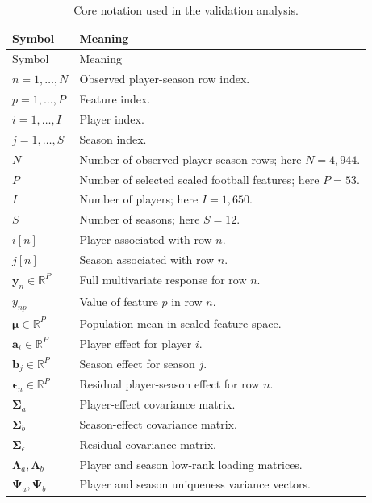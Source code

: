 \documentclass[11pt]{article}
\begin{document}
\begin{longtable}{L{0.20\textwidth}L{0.72\textwidth}}
\caption{Core notation used in the validation analysis.}
\label{tab:notation}\\
\toprule
Symbol & Meaning \\
\midrule
\endfirsthead
\toprule
Symbol & Meaning \\
\midrule
\endhead
\bottomrule
\endfoot
\(n = 1,\ldots,N\) & Observed player-season row index. \\
\(p = 1,\ldots,P\) & Feature index. \\
\(i = 1,\ldots,I\) & Player index. \\
\(j = 1,\ldots,S\) & Season index. \\
\(N\) & Number of observed player-season rows; here \(N=4{,}944\). \\
\(P\) & Number of selected scaled football features; here \(P=53\). \\
\(I\) & Number of players; here \(I=1{,}650\). \\
\(S\) & Number of seasons; here \(S=12\). \\
\(i[n]\) & Player associated with row \(n\). \\
\(j[n]\) & Season associated with row \(n\). \\
\(\mathbf{y}_n\in\mathbb{R}^{P}\) & Full multivariate response for row \(n\). \\
\(y_{np}\) & Value of feature \(p\) in row \(n\). \\
\(\boldsymbol{\mu}\in\mathbb{R}^{P}\) & Population mean in scaled feature space. \\
\(\mathbf{a}_i\in\mathbb{R}^{P}\) & Player effect for player \(i\). \\
\(\mathbf{b}_j\in\mathbb{R}^{P}\) & Season effect for season \(j\). \\
\(\boldsymbol{\epsilon}_n\in\mathbb{R}^{P}\) & Residual player-season effect for row \(n\). \\
\(\boldsymbol{\Sigma}_a\) & Player-effect covariance matrix. \\
\(\boldsymbol{\Sigma}_b\) & Season-effect covariance matrix. \\
\(\boldsymbol{\Sigma}_{\epsilon}\) & Residual covariance matrix. \\
\(\boldsymbol{\Lambda}_a,\boldsymbol{\Lambda}_b\) & Player and season low-rank loading matrices. \\
\(\boldsymbol{\Psi}_a,\boldsymbol{\Psi}_b\) & Player and season uniqueness variance vectors. \\
\end{longtable}
\end{document}
